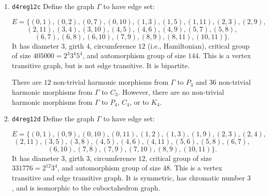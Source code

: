 \documentclass[12pt,letterpaper]{article}
\theoremstyle{definition}
\begin{document}
\begin{enumerate}
There are $6$ non-trivial harmonic
morphisms\footnote{This is another example where it appears
  all of these are multicovers
  (with constant horizontal multiplicity $2$ and constant vertical
  multiplicity $0$).} from $\Gamma$ to $C_3$,
$8$ non-trivial harmonic
morphisms\footnote{Moreover, it appears all of these are quasicovers
  (with constant horizontal multiplicity $1$ and constant vertical
  multiplicity $2$).}
from $\Gamma$ to $C_4$,
$10$ non-trivial harmonic morphisms from $\Gamma$ to $P_3$.
However, there
are no non-trivial harmonic morphisms from $\Gamma$ to $P_4$ or to $K_4$.


\item
  
 {\tt d4reg12c}\newline
  Define the graph  $\Gamma$
  to have edge set:

\[
E = \{
(0, 1), (0, 2), (0, 7), (0, 10), (1, 3), (1, 5), (1, 11), (2, 3), (2, 9),
\]
\[
 (2, 11), (3, 4), (3, 10), (4, 5), (4, 6), (4, 9), (5, 7), (5, 8),
\]
\[
 (6, 7), (6, 8), (6, 10), (7, 9), (8, 9), (8, 11), (10, 11)
\}.
\]
It has diameter $3$,
girth $4$, circumference $12$ (i.e., Hamiltonian),
critical group of size $405000 = 2^3 3^4 5^4$, 
and automorphism group of size $144$. This is a vertex transitive graph,
but is not edge transitive. It is bipartite.

There are $12$ non-trivial harmonic morphisms from $\Gamma$ to $P_3$
and $36$ non-trivial harmonic morphisms from $\Gamma$ to $C_3$.
However, there are no non-trivial harmonic morphisms
from $\Gamma$ to $P_4$, $C_4$, or to $K_4$.
  
\item
  
 {\tt d4reg12d}\newline
  Define the graph  $\Gamma$
  to have edge set:

\[
E = \{
(0, 1), (0, 9), (0, 10), (0, 11), (1, 2), (1, 3), (1, 9), (2, 3), (2, 4), 
\]
\[
(2, 11), (3, 5), (3, 8), (4, 5), (4, 6), (4, 11), (5, 6), (5, 8), (6, 7),
\]
\[
(6, 10), (7, 8), (7, 9), (7, 10), (8, 9), (10, 11)
\}.
\]
It has diameter $3$,
girth $3$, circumference $12$,
critical group of size $331776 = 2^{12} 3^4$, 
and automorphism group of size $48$. This is a vertex transitive and
edge transitive graph. It is symmetric, has chromatic number $3$,
and is isomorphic to the cuboctahedron graph.


\end{enumerate}
\end{document}
